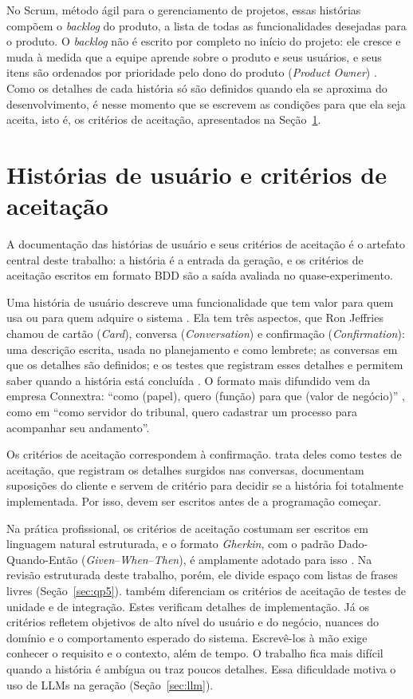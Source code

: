 No Scrum, método ágil para o gerenciamento de projetos, essas histórias compõem o \textit{backlog} do produto, a lista de todas as funcionalidades desejadas para o produto. O \textit{backlog} não é escrito por completo no início do projeto: ele cresce e muda à medida que a equipe aprende sobre o produto e seus usuários, e seus itens são ordenados por prioridade pelo dono do produto (\textit{Product Owner}) \cite{cohn2004}. Como os detalhes de cada história só são definidos quando ela se aproxima do desenvolvimento, é nesse momento que se escrevem as condições para que ela seja aceita, isto é, os critérios de aceitação, apresentados na Seção~\ref{sec:hu-ca}.

\section{Histórias de usuário e critérios de aceitação}
\label{sec:hu-ca}

A documentação das histórias de usuário e seus critérios de aceitação é o artefato central deste trabalho: a história é a entrada da geração, e os critérios de aceitação escritos em formato BDD são a saída avaliada no quase-experimento.

Uma história de usuário descreve uma funcionalidade que tem valor para quem usa ou para quem adquire o sistema \cite{cohn2004}. Ela tem três aspectos, que Ron Jeffries chamou de cartão (\textit{Card}), conversa (\textit{Conversation}) e confirmação (\textit{Confirmation}): uma descrição escrita, usada no planejamento e como lembrete; as conversas em que os detalhes são definidos; e os testes que registram esses detalhes e permitem saber quando a história está concluída \cite{cohn2004}. O formato mais difundido vem da empresa Connextra: ``como (papel), quero (função) para que (valor de negócio)'' \cite{cohn2004}, como em ``como servidor do tribunal, quero cadastrar um processo para acompanhar seu andamento''.

Os critérios de aceitação correspondem à confirmação.  trata deles como testes de aceitação, que registram os detalhes surgidos nas conversas, documentam suposições do cliente e servem de critério para decidir se a história foi totalmente implementada. Por isso, devem ser escritos antes de a programação começar.

Na prática profissional, os critérios de aceitação costumam ser escritos em linguagem natural estruturada, e o formato \textit{Gherkin}, com o padrão Dado-Quando-Então (\textit{Given}--\textit{When}--\textit{Then}), é amplamente adotado para isso \cite{wang2025}. Na revisão estruturada deste trabalho, porém, ele divide espaço com listas de frases livres (Seção~\ref{sec:qp5}).  também diferenciam os critérios de aceitação de testes de unidade e de integração. Estes verificam detalhes de implementação. Já os critérios refletem objetivos de alto nível do usuário e do negócio, nuances do domínio e o comportamento esperado do sistema. Escrevê-los à mão exige conhecer o requisito e o contexto, além de tempo. O trabalho fica mais difícil quando a história é ambígua ou traz poucos detalhes. Essa dificuldade motiva o uso de LLMs na geração (Seção~\ref{sec:llm}).

